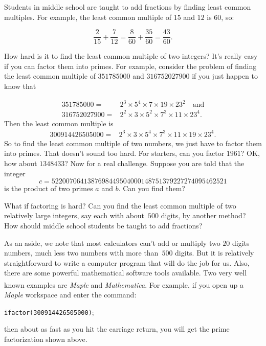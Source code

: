 \begin{example}
Students in middle school are taught to add fractions by finding
least common multiples.  For example, the least common multiple
of $15$ and $12$ is $60$, so:

\[
\frac{2}{15}+ \frac{7}{12} = \frac{8}{60}+\frac{35}{60} = \frac{43}{60}.
\]

How hard is it to find the least common multiple of two integers?
It's really easy if you can factor them into primes.  For example,
consider the problem of finding the least common multiple
of $351785000$ and  $316752027900$ if you just happen to know that

\begin{align*}
 351785000 = & 2^3\times 5^4\times 7\times19\times 23^2\quad\text{and}\\ 
 316752027900 = & 2^2\times3\times 5^2\times 7^3\times 11\times 23^4. 
\end{align*}
Then the least common multiple is
\begin{align*}
300914426505000 = & 2^3\times3\times 5^4\times 7^3\times 11\times 19\times 23^4.
\end{align*}
So to find the least common multiple of two numbers, we just have
to factor them into primes.  That doesn't sound too hard. For starters, can you
factor $1961$?  OK, how about $1348433$?  Now for a real challenge.
Suppose you are told that the integer
\[
c = 5220070641387698449504000148751379227274095462521
\]
is the product of two primes $a$ and $b$.  Can you find them?

What if factoring is hard?  Can you find the least common multiple of
two relatively large integers, say each with about~$500$ digits, by
another method? How should middle school students be taught to add
fractions?

As an aside, we note that most calculators can't add or multiply two
$20$ digits numbers, much less two numbers with more than~$500$
digits.  But it is relatively straightforward to write a computer
program that will do the job for us.  Also, there are some powerful
mathematical software tools available.  Two very well known examples
are \emph{Maple}\textsuperscript{\tiny\textregistered} and
\emph{Mathematica}\textsuperscript{\tiny\textregistered}.  For example, if you open up a
\emph{Maple} workspace and enter the command:

\begin{center}
\texttt{ifactor(300914426505000)};
\end{center}
then about as fast as you hit the carriage return, you
will get the prime factorization shown above.


\end{example}

